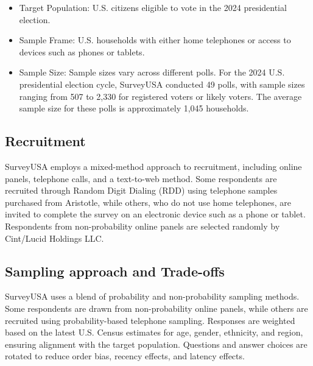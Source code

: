\documentclass[
  letterpaper,
  DIV=11,
  numbers=noendperiod]{scrartcl}
\providecommand{\tightlist}{%
  \setlength{\itemsep}{0pt}\setlength{\parskip}{0pt}}\usepackage{longtable,booktabs,array}
\begin{document}
\begin{itemize}
\tightlist
\item
  Target Population: U.S. citizens eligible to vote in the 2024
  presidential election.\\
\item
  Sample Frame: U.S. households with either home telephones or access to
  devices such as phones or tablets.\\
\item
  Sample Size: Sample sizes vary across different polls. For the 2024
  U.S. presidential election cycle, SurveyUSA conducted 49 polls, with
  sample sizes ranging from 507 to 2,330 for registered voters or likely
  voters. The average sample size for these polls is approximately 1,045
  households.\\
\end{itemize}

\subsection{\texorpdfstring{Recruitment\\
}{Recruitment }}\label{recruitment}

SurveyUSA employs a mixed-method approach to recruitment, including
online panels, telephone calls, and a text-to-web method. Some
respondents are recruited through Random Digit Dialing (RDD) using
telephone samples purchased from Aristotle, while others, who do not use
home telephones, are invited to complete the survey on an electronic
device such as a phone or tablet. Respondents from non-probability
online panels are selected randomly by Cint/Lucid Holdings LLC.\\

\subsection{\texorpdfstring{Sampling approach and Trade-offs\\
}{Sampling approach and Trade-offs }}\label{sampling-approach-and-trade-offs}

SurveyUSA uses a blend of probability and non-probability sampling
methods. Some respondents are drawn from non-probability online panels,
while others are recruited using probability-based telephone sampling.
Responses are weighted based on the latest U.S. Census estimates for
age, gender, ethnicity, and region, ensuring alignment with the target
population. Questions and answer choices are rotated to reduce order
bias, recency effects, and latency effects.\\
\end{document}
